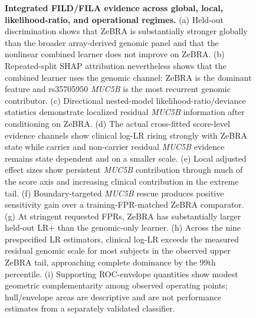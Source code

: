 {\begin{figure}[!p]
{%
}
\caption{\textbf{Integrated FILD/FILA evidence across global, local, likelihood-ratio, and operational regimes.}
(a) Held-out discrimination shows that ZeBRA is substantially stronger globally than the broader array-derived genomic panel and that the nonlinear combined learner does not improve on ZeBRA. (b) Repeated-split SHAP attribution nevertheless shows that the combined learner uses the genomic channel: ZeBRA is the dominant feature and rs35705950 \textit{MUC5B} is the most recurrent genomic contributor. (c) Directional nested-model likelihood-ratio/deviance statistics demonstrate localized residual \textit{MUC5B} information after conditioning on ZeBRA. (d) The actual cross-fitted score-level evidence channels show clinical log-LR rising strongly with ZeBRA state while carrier and non-carrier residual \textit{MUC5B} evidence remains state dependent and on a smaller scale. (e) Local adjusted effect sizes show persistent \textit{MUC5B} contribution through much of the score axis and increasing clinical contribution in the extreme tail. (f) Boundary-targeted \textit{MUC5B} rescue produces positive sensitivity gain over a training-FPR-matched ZeBRA comparator. (g) At stringent requested FPRs, ZeBRA has substantially larger held-out LR$+$ than the genomic-only learner. (h) Across the nine prespecified LR estimators, clinical log-LR exceeds the measured residual genomic scale for most subjects in the observed upper ZeBRA tail, approaching complete dominance by the 99th percentile. (i) Supporting ROC-envelope quantities show modest geometric complementarity among observed operating points; hull/envelope areas are descriptive and are not performance estimates from a separately validated classifier.}
\label{fig:integrated-fild}
\end{figure}%
}

